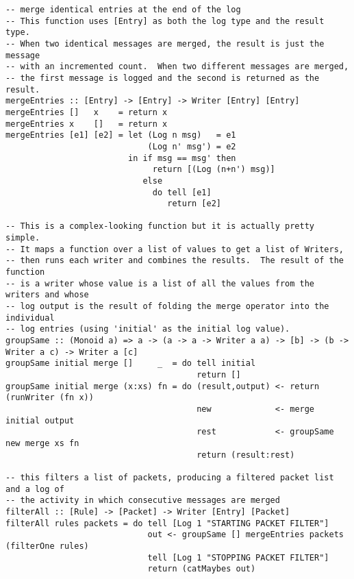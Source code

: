 \begin{verbatim}
-- merge identical entries at the end of the log
-- This function uses [Entry] as both the log type and the result type.
-- When two identical messages are merged, the result is just the message
-- with an incremented count.  When two different messages are merged,
-- the first message is logged and the second is returned as the result.
mergeEntries :: [Entry] -> [Entry] -> Writer [Entry] [Entry]
mergeEntries []   x    = return x
mergeEntries x    []   = return x
mergeEntries [e1] [e2] = let (Log n msg)   = e1
                             (Log n' msg') = e2
                         in if msg == msg' then
                              return [(Log (n+n') msg)]
                            else
                              do tell [e1]
                                 return [e2]

-- This is a complex-looking function but it is actually pretty simple.
-- It maps a function over a list of values to get a list of Writers,
-- then runs each writer and combines the results.  The result of the function
-- is a writer whose value is a list of all the values from the writers and whose
-- log output is the result of folding the merge operator into the individual
-- log entries (using 'initial' as the initial log value).
groupSame :: (Monoid a) => a -> (a -> a -> Writer a a) -> [b] -> (b -> Writer a c) -> Writer a [c]
groupSame initial merge []     _  = do tell initial
                                       return []
groupSame initial merge (x:xs) fn = do (result,output) <- return (runWriter (fn x))
                                       new             <- merge initial output
                                       rest            <- groupSame new merge xs fn
                                       return (result:rest)

-- this filters a list of packets, producing a filtered packet list and a log of
-- the activity in which consecutive messages are merged
filterAll :: [Rule] -> [Packet] -> Writer [Entry] [Packet]
filterAll rules packets = do tell [Log 1 "STARTING PACKET FILTER"]
                             out <- groupSame [] mergeEntries packets (filterOne rules)
                             tell [Log 1 "STOPPING PACKET FILTER"]
                             return (catMaybes out)
\end{verbatim}
\clearpage

